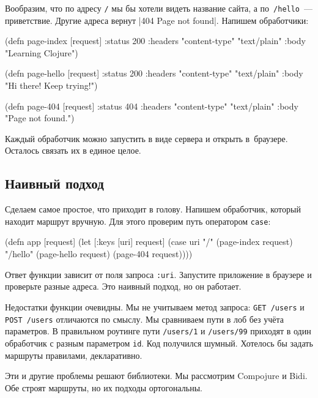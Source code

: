 Вообразим, что по адресу \verb|/| мы бы хотели видеть название сайта, а
по~\verb|/hello|~--- приветствие. Другие адреса вернут
\spverb|404 Page not found|. Напишем обработчики:

\begin{english}
  \begin{clojure}
(defn page-index [request]
  {:status 200
   :headers {"content-type" "text/plain"}
   :body "Learning Clojure"})

(defn page-hello [request]
  {:status 200
   :headers {"content-type" "text/plain"}
   :body "Hi there! Keep trying!"})

(defn page-404 [request]
  {:status 404
   :headers {"content-type" "text/plain"}
   :body "Page not found."})
  \end{clojure}
\end{english}

Каждый обработчик можно запустить в виде сервера и открыть в~браузере. Осталось
связать их в единое целое.

\subsection{Наивный подход}

Сделаем самое простое, что приходит в голову. Напишем обработчик, который
находит маршрут вручную. Для этого проверим путь оператором \verb|case|:

\begin{english}
  \begin{clojure}
(defn app [request]
  (let [{:keys [uri]} request]
    (case uri
      "/"      (page-index request)
      "/hello" (page-hello request)
      (page-404 request))))
  \end{clojure}
\end{english}

Ответ функции зависит от поля запроса \verb|:uri|. Запустите приложение в
браузере и проверьте разные адреса. Это наивный подход, но он работает.

\mnoindent
Недостатки функции очевидны. Мы не учитываем метод запроса: \verb|GET /users|
и \verb|POST /users| отличаются по смыслу. Мы сравниваем пути в лоб без учёта
параметров. В правильном роутинге пути \verb|/users/1| и \verb|/users/99|
приходят в один обработчик с разным параметром \verb|id|. Код получился
шумный. Хотелось бы задать маршруты правилами, декларативно.

Эти и другие проблемы решают библиотеки. Мы рассмотрим Compojure и Bidi. Обе
строят маршруты, но их подходы ортогональны.

